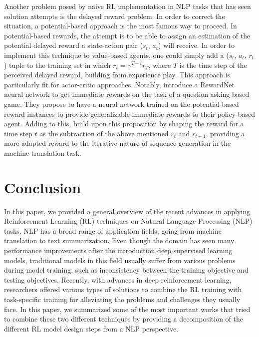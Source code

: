 \documentclass[twocolumn]{article}
\begin{document}
Another problem posed by naive RL implementation in NLP tasks that has seen solution attempts is the delayed reward problem. In order to correct the situation, a potential-based approach \citep{Ng:1999:PIU:645528.657613} is the most famous way to proceed. In potential-based rewards, the attempt is to be able to assign an estimation of the potential delayed reward a state-action pair ($s_t$, $a_t$) will receive. In order to implement this technique to value-based agents, one could simply add a ($s_t$, $a_t$, $r_t$) tuple to the training set in which $r_t = \gamma^{T-t} r_T$, where $T$ is the time step of the perceived delayed reward, building from experience play. This approach is particularly fit for actor-critic approaches. Notably, \citep{20q-games} introduce a RewardNet neural network to get immediate rewards on the task of a question asking based game. They propose to have a neural network trained on the potential-based reward instances to provide generalizable immediate rewards to their policy-based agent. Adding to this, \citep{BahdanauBXGLPCB16} build upon this proposition by shaping the reward for a time step $t$ as the subtraction of the above mentioned $r_t$ and $r_{t-1}$, providing a more adapted reward to the iterative nature of sequence generation in the machine translation task.

\section{Conclusion}

In this paper, we provided a general overview of the recent advances
in applying Reinforcement Learning  (RL)  techniques on Natural Language Processing (NLP) tasks. NLP has a broad range of application fields, going from machine translation to text summarization. Even though the domain has seen many performance improvements after the introduction deep supervised learning models, traditional models in this field
usually suffer from various problems during model training,
such  as  inconsistency  between  the  training  objective  and
testing objectives. Recently, with advances
in  deep  reinforcement  learning,  researchers  offered  various  types  of  solutions  to  combine  the  RL  training  with task-specific training for alleviating the problems and challenges
they usually face.  In  this  paper,  we  summarized
some  of  the  most  important  works  that  tried  to  combine
these two different techniques by providing a decomposition of the different RL model design steps from a NLP perspective.

\printbibliography
\end{document}
